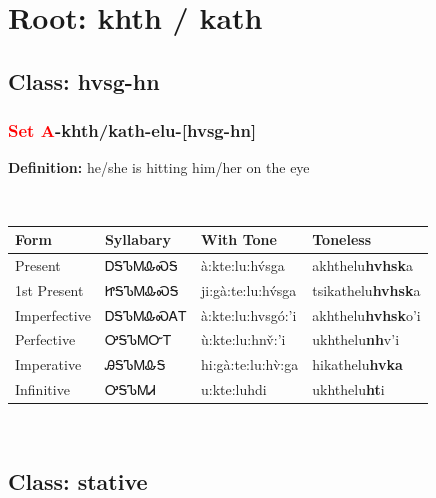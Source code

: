 \needspace{4in}
\section*{Root: khth / kath}
\nopagebreak
{}
\needspace{3in}
\subsection*{Class: hvsg-hn}
\nopagebreak
\needspace{2in}
\subsubsection*{\textcolor{Red}{Set A}{-}\textbf{khth/kath}{-}elu{-}[hvsg-hn]}
\nopagebreak
\textbf{Definition: } he/she is hitting him/her on the eye
\\[0.5em]
\begin{tabularx}{\textwidth}{l X X X}%
\toprule%
\textbf{Form}&\textbf{Syllabary}&\textbf{With Tone}&\textbf{Toneless}\\%
\midrule%
Present&ᎠᎦᏖᎷᎲᏍᎦ&à:kte:lu:hv́sga&akhthelu\textbf{hvhsk}a\\%
1st Present&ᏥᎦᏖᎷᎲᏍᎦ&ji:gà:te:lu:hv́sga&tsikathelu\textbf{hvhsk}a\\%
Imperfective&ᎠᎦᏖᎷᎲᏍᎪᎢ&à:kte:lu:hvsgó:’i&akhthelu\textbf{hvhsk}o'i\\%
Perfective&ᎤᎦᏖᎷᏅᎢ&ù:kte:lu:hnv̌:’i&ukhthelu\textbf{nh}v'i\\%
Imperative&ᎯᎦᏖᎷᎲᎦ&hi:gà:te:lu:hv̀:ga&hikathelu\textbf{hvka}\\%
Infinitive&ᎤᎦᏖᎷᏗ&u:kte:luhdi&ukhthelu\textbf{ht}i\\%
\bottomrule%
\end{tabularx}
\\[1em]
\needspace{3in}
\subsection*{Class: stative}
\nopagebreak
\needspace{2in}
